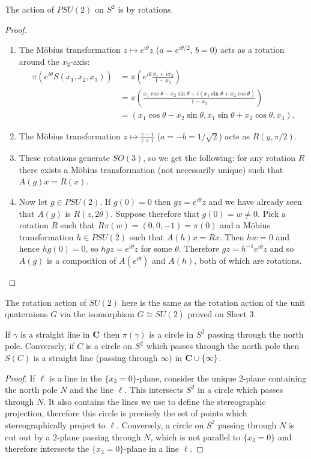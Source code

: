 \documentclass[12pt]{article}
\begin{document}
  \begin{thm}\label{thm:mobrot}
    The action of $PSU(2)$ on $S^2$ is by rotations.
  \end{thm}
  \begin{proof}
    \begin{enumerate}
    \item The M\"obius transformation $z\mapsto e^{i\theta}z$ ($a=e^{i\theta/2}$, $b=0$) acts as a rotation around the $x_3$-axis:
      \begin{align*}
        \pi(e^{i\theta}S(x_1,x_2,x_3))&=\pi\left(e^{i\theta}\frac{x_1+ix_2}{1-x_3}\right)\\
        &=\pi\left(\frac{x_1\cos\theta-x_2\sin\theta+i(x_1\sin\theta+x_2\cos\theta)}{1-x_3}\right)\\
        &=(x_1\cos\theta-x_2\sin\theta,x_1\sin\theta+x_2\cos\theta,x_3).
      \end{align*}
    \item The M\"obius transformation $z\mapsto\frac{z-1}{z+1}$ ($a=-b=1/\sqrt{2}$) acts as $R(y,\pi/2)$.
    \item These rotations generate $SO(3)$, so we get the following: for any rotation $R$ there exists a M\"obius transformation (not necessarily unique) such that $A(g)x=R(x)$.
    \item Now let $g\in PSU(2)$. If $g(0)=0$ then $gz=e^{i\theta}z$ and we have already seen that $A(g)$ is $R(z,2\theta)$. Suppose therefore that $g(0)=w\neq 0$. Pick a rotation $R$ such that $R\pi(w)=(0,0,-1)=\pi(0)$ and a M\"obius transformation $h\in PSU(2)$ such that $A(h)x=Rx$. Then $hw=0$ and hence $hg(0)=0$, so $hgz=e^{i\theta}z$ for some $\theta$. Therefore $gz=h^{-1}e^{i\theta}z$ and so $A(g)$ is a composition of $A(e^{i\theta})$ and $A(h)$, both of which are rotations.
    \end{enumerate}
  \end{proof}

  \begin{rmk}
    The rotation action of $SU(2)$ here is the same as the rotation action of the unit quaternions $G$ via the isomorphism $G\cong SU(2)$ proved on Sheet 3.
  \end{rmk}
  
  \begin{lma}
    If $\gamma$ is a straight line in $\mathbf{C}$ then $\pi(\gamma)$ is a
    circle in $S^2$ passing through the north pole. Conversely, if $C$
    is a circle on $S^2$ which passes through the north pole then
    $S(C)$ is a straight line (passing through $\infty$) in
    $\mathbf{C}\cup\{\infty\}$.
\end{lma}
\begin{proof}
  If $\ell$ is a line in the $\{x_3=0\}$-plane, consider the unique
  2-plane containing the north pole $N$ and the line $\ell$. This
  intersects $S^2$ in a circle which passes through $N$. It also
  contains the lines we use to define the stereographic projection,
  therefore this circle is precisely the set of points which
  stereographically project to $\ell$. Conversely, a circle on $S^2$
  passing through $N$ is cut out by a 2-plane passing through $N$,
  which is not parallel to $\{x_3=0\}$ and therefore intersects the
  $\{x_3=0\}$-plane in a line $\ell$.
\end{proof}
\end{document}
